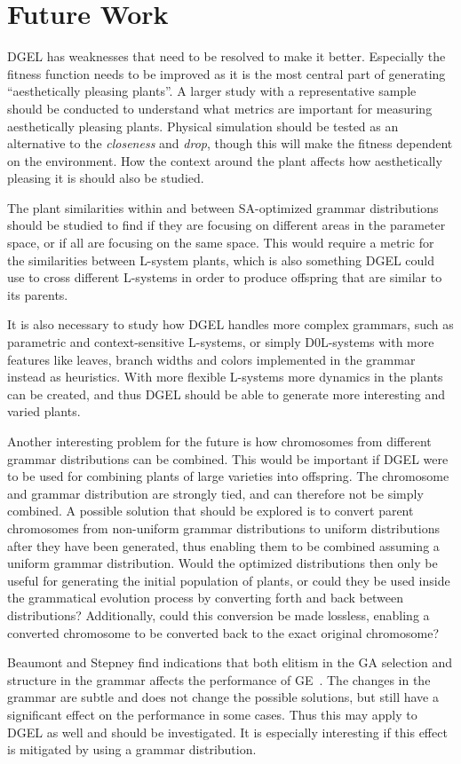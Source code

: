 \section{Future Work}
\gls{DGEL} has weaknesses that need to be resolved to make it better.
Especially the fitness function needs to be improved as it is the most central part of generating ``aesthetically pleasing plants''.
A larger study with a representative sample should be conducted to understand what metrics are important for measuring aesthetically pleasing plants.
Physical simulation should be tested as an alternative to the \textit{closeness} and \textit{drop}, though this will make the fitness dependent on the environment.
How the context around the plant affects how aesthetically pleasing it is should also be studied.

The plant similarities within and between \gls{SA}-optimized grammar distributions should be studied to find if they are focusing on different areas in the parameter space, or if all are focusing on the same space.
This would require a metric for the similarities between \gls{L-system} plants, which is also something \gls{DGEL} could use to cross different \glspl{L-system} in order to produce offspring that are similar to its parents.

It is also necessary to study how \gls{DGEL} handles more complex grammars, such as parametric and context-sensitive \glspl{L-system}, or simply D0L-systems with more features like leaves, branch widths and colors implemented in the grammar instead as heuristics.
With more flexible \glspl{L-system} more dynamics in the plants can be created, and thus \gls{DGEL} should be able to generate more interesting and varied plants.

Another interesting problem for the future is how chromosomes from different grammar distributions can be combined.
This would be important if \gls{DGEL} were to be used for combining plants of large varieties into offspring.
The chromosome and grammar distribution are strongly tied, and can therefore not be simply combined.
A possible solution that should be explored is to convert parent chromosomes from non-uniform grammar distributions to uniform distributions after they have been generated, thus enabling them to be combined assuming a uniform grammar distribution.
Would the optimized distributions then only be useful for generating the initial population of plants, or could they be used inside the grammatical evolution process by converting forth and back between distributions?
Additionally, could this conversion be made lossless, enabling a converted chromosome to be converted back to the exact original chromosome?

Beaumont and Stepney find indications that both elitism in the \gls{GA} selection and structure in the grammar affects the performance of \gls{GE}~\cite{2009Beaumont}.
The changes in the grammar are subtle and does not change the possible solutions, but still have a significant effect on the performance in some cases.
Thus this may apply to \gls{DGEL} as well and should be investigated.
It is especially interesting if this effect is mitigated by using a grammar distribution.
